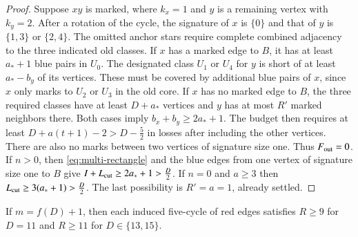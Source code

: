 \begin{proof}
Suppose $xy$ is marked, where $k_x=1$ and $y$ is a remaining
vertex with $k_y=2$. After a rotation of the cycle, the signature
of $x$ is $\{0\}$ and that of $y$ is $\{1,3\}$ or $\{2,4\}$. The omitted anchor stars require
complete combined adjacency to the three indicated old classes.
If $x$ has a marked edge to $B$, it has at least $a_*+1$ blue pairs
in $U_0$. The designated class $U_1$ or $U_4$ for $y$ is short of
at least $a_*-b_y$ of its vertices. These must be covered by
additional blue pairs of $x$, since $x$ only marks to $U_2$ or
$U_3$ in the old core. If $x$ has no marked edge to $B$, the
three required classes have at least $D+a_*$ vertices and $y$
has at most $R'$ marked neighbors there. Both cases imply
$b_x+b_y\ge2a_*+1$. The budget then requires at least
$D+a(t+1)-2>D-\frac{5}{2}$ in losses after including the other vertices.
There are also no marks between two vertices of signature size one.
Thus $F_{\rm out}=0$. If $n>0$, then \eqref{eq:multi-rectangle} and the blue edges
from one vertex of signature size one to $B$ give $I+L_{\rm cut}\ge2a_*+1>\frac{D}{2}$.
If $n=0$ and $a\ge3$ then $L_{\rm cut}\ge3(a_*+1)>\frac{D}{2}$.
The last possibility is $R'=a=1$, already settled.


\end{proof}

\begin{lemma}\label{lem:odd-slack-refinements}
If $m=f(D)+1$, then each induced five-cycle of red edges satisfies
$R\ge9$ for $D=11$ and $R\ge11$ for $D\in\{13,15\}$.
\end{lemma}

